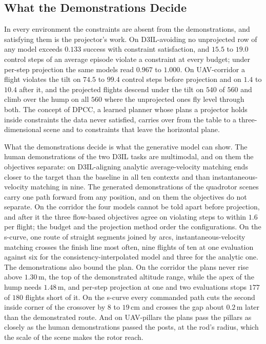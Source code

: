 \subsection{What the Demonstrations Decide}\label{sec:disc:demonstrations}

In every environment the constraints are absent from the demonstrations, and satisfying them is the
projector's work. On D3IL-avoiding no unprojected row of any model exceeds $0.133$ success with
constraint satisfaction, and $15.5$ to $19.0$ control steps of an average episode violate a constraint
at every budget; under per-step projection the same models read $0.967$ to $1.000$. On UAV-corridor a
flight violates the tilt on $74.5$ to $99.4$ control steps before projection and on $1.4$ to $10.4$
after it, and the projected flights descend under the tilt on $540$ of $560$ and climb over the hump on
all $560$ where the unprojected ones fly level through both. The concept of \ac{DPCC}, a learned
planner whose plans a projector holds inside constraints the data never satisfied, carries over from
the table to a three-dimensional scene and to constraints that leave the horizontal plane.

What the demonstrations decide is what the generative model can show. The human demonstrations of the
two D3IL tasks are multimodal, and on them the objectives separate: on D3IL-aligning analytic
average-velocity matching ends closer to the target than the baseline in all ten contexts and than
instantaneous-velocity matching in nine. The generated demonstrations of the quadrotor scenes carry
one path forward from any position, and on them the objectives do not separate. On the corridor the
four models cannot be told apart before projection, and after it the three flow-based objectives agree
on violating steps to within $1.6$ per flight; the budget and the projection method order the
configurations. On the s-curve, one route of straight segments joined by arcs, instantaneous-velocity
matching crosses the finish line most often, nine flights of ten at one evaluation against six for the
consistency-interpolated model and three for the analytic one. The demonstrations also bound the plan.
On the corridor the plans never rise above $1.30$\,m, the top of the demonstrated altitude range, while
the apex of the hump needs $1.48$\,m, and per-step projection at one and two evaluations stops $177$ of
$180$ flights short of it. On the s-curve every commanded path cuts the second inside corner of the
crossover by $8$ to $19$\,cm and crosses the gap about $0.2$\,m later than the demonstrated route. And on
UAV-pillars the plans pass the pillars as closely as the human demonstrations passed the posts, at the
rod's radius, which the scale of the scene makes the rotor reach.

